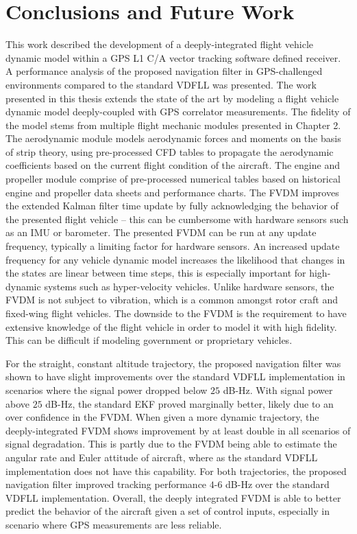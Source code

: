 \chapter{\textbf{Conclusions and Future Work}}
This work described the development of a deeply-integrated flight vehicle dynamic model within a GPS L1 C/A vector tracking software defined receiver. A performance analysis of the proposed navigation filter in GPS-challenged environments compared to the standard VDFLL was presented. The work presented in this thesis extends the state of the art by modeling a flight vehicle dynamic model deeply-coupled with GPS correlator measurements. The fidelity of the model stems from multiple flight mechanic modules presented in Chapter 2. The aerodynamic module models aerodynamic forces and moments on the basis of strip theory, using pre-processed CFD tables to propagate the aerodynamic coefficients based on the current flight condition of the aircraft. The engine and propeller module comprise of pre-processed numerical tables based on historical engine and propeller data sheets and performance charts. The FVDM improves the extended Kalman filter time update by fully acknowledging the behavior of the presented flight vehicle {--} this can be cumbersome with hardware sensors such as an IMU or barometer. The presented FVDM can be run at any update frequency, typically a limiting factor for hardware sensors. An increased update frequency for any vehicle dynamic model increases the likelihood that changes in the states are linear between time steps, this is especially important for high-dynamic systems such as hyper-velocity vehicles. Unlike hardware sensors, the FVDM is not subject to vibration, which is a common amongst rotor craft and fixed-wing flight vehicles. The downside to the FVDM is the requirement to have extensive knowledge of the flight vehicle in order to model it with high fidelity. This can be difficult if modeling government or proprietary vehicles.

For the straight, constant altitude trajectory, the proposed navigation filter was shown to have slight improvements over the standard VDFLL implementation in scenarios where the signal power dropped below \(25\) dB-Hz. With signal power above \(25\) dB-Hz, the standard EKF proved marginally better, likely due to an over confidence in the FVDM\@. When given a more dynamic trajectory, the deeply-integrated FVDM shows improvement by at least double in all scenarios of signal degradation. This is partly due to the FVDM being able to estimate the angular rate and Euler attitude of aircraft, where as the standard VDFLL implementation does not have this capability. For both trajectories, the proposed navigation filter improved tracking performance \(4\){-}\(6\) dB-Hz over the standard VDFLL implementation. Overall, the deeply integrated FVDM is able to better predict the behavior of the aircraft given a set of control inputs, especially in scenario where GPS measurements are less reliable.

